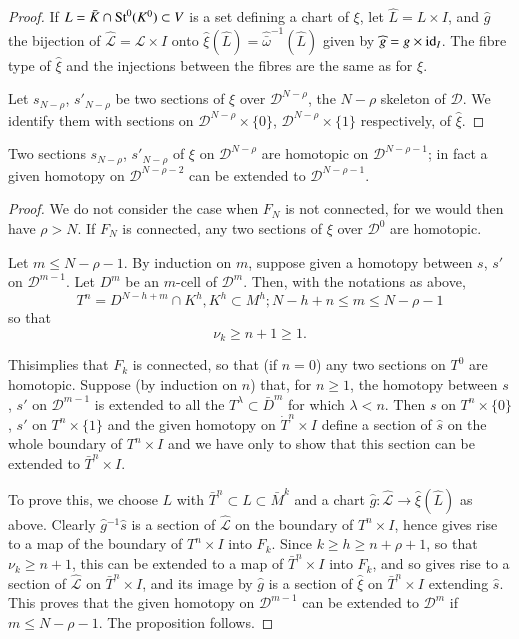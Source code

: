 \begin{proof}
If $L=\bar{K}\cap \operatorname{St}^{0}(K^{0})\subset V$ is a set defining a chart
of $\xi$, let $\widehat{L}=L\times I$, and $\widehat{g}$ the bijection
of $\widehat{\mathscr{L}}=\mathscr{L}\times I$ onto
$\widehat{\xi}(\widehat{L})=\widehat{\bar{\omega}}^{-1}(\widehat{L})$
given by $\widehat{g}=g\times \operatorname{id}_{I}$. The fibre type of
$\widehat{\xi}$ and the injections between the fibres are the same as
for $\xi$.

Let $s_{N-\rho}$, $s'_{N-\rho}$ be two sections of $\xi$ over
$\mathscr{D}^{N-\rho}$, the $N-\rho$ skeleton of $\mathscr{D}$. We
identify them with sections on $\mathscr{D}^{N-\rho}\times\{0\}$,
$\mathscr{D}^{N-\rho}\times \{1\}$ respectively, of $\widehat{\xi}$. 
\end{proof}  

\begin{proposition}\label{chap4-prop2} %
Two sections $s_{N-\rho}$, $s'_{N-\rho}$ of $\xi$ on
$\mathscr{D}^{N-\rho}$ are homotopic on $\mathscr{D}^{N-\rho-1}$; in
fact a given homotopy on $\mathscr{D}^{N-\rho-2}$ can be extended to
$\mathscr{D}^{N-\rho-1}$. 
\end{proposition} 

\begin{proof} %
We do not consider the case when $F_{N}$ is not connected, for we
would then have $\rho>N$. If $F_{N}$ is connected, any two sections of
$\xi$ over $\mathscr{D}^{0}$ are homotopic.

Let $m\leq N-\rho-1$. By induction on $m$, suppose given a homotopy
between $s$, $s'$ on $\mathscr{D}^{m-1}$. Let $D^{m}$ be an $m$-cell
of $\mathscr{D}^{m}$. Then, with the notations as above,
$$
T^{n}=D^{N-h+m}\cap K^{h}, K^{h}\subset M^{h}; N-h+n\leq m\leq N-\rho-1
$$
so that
$$
\nu_{k}\geq n+1\geq 1.
$$

This\pageoriginale implies that $F_{k}$ is connected, so that (if
$n=0$) any two sections on $T^{0}$ are homotopic. Suppose (by
induction on $n$) that, for $n\geq 1$, the homotopy between $s$, $s'$
on $\mathscr{D}^{m-1}$ is extended to all the $T^{\lambda}\subset
\bar{D}^{m}$ for which $\lambda<n$. Then $s$ on $T^{n}\times \{0\}$,
$s'$ on $T^{n}\times \{1\}$ and the given homotopy on
$\dot{T}^{n}\times I$ define a section of $\widehat{s}$ on the whole
boundary of $T^{n}\times I$ and we have only to show that this section
can be extended to $\bar{T}^{n}\times I$.

To prove this, we choose $L$ with $\bar{T}^{n}\subset L\subset
\bar{M}^{k}$ and a chart $\widehat{g}:\widehat{\mathscr{L}}\to
\widehat{\xi}(\widehat{L})$ as above. Clearly
$\widehat{g}{}^{-1}\widehat{s}$ is a section of
$\widehat{\mathscr{L}}$ on the boundary of $T^{n}\times I$, hence
gives rise to a map of the boundary of $T^{n}\times I$ into
$F_{k}$. Since $k\geq h\geq n+\rho+1$, so that $\nu_{k}\geq n+1$, this
can be extended to a map of $\bar{T}^{n}\times I$ into $F_{k}$, and so
gives rise to a section of $\widehat{\mathscr{L}}$ on
$\bar{T}^{n}\times I$, and its image by $\widehat{g}$ is a section of
$\widehat{\xi}$ on $\bar{T}^{n}\times I$ extending $\widehat{s}$. This
proves that the given homotopy on $\mathscr{D}^{m-1}$ can be extended
to $\mathscr{D}^{m}$ if $m\leq N-\rho-1$. The proposition follows.
\end{proof}

